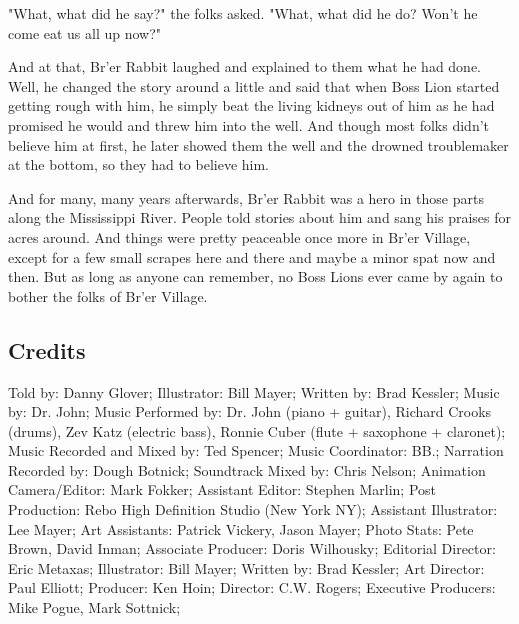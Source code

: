 "What, what did he say?" the folks asked. "What, what did he do? Won't he come eat us all up now?"

And at that, Br'er Rabbit laughed and explained to them what he had done. Well, he changed the story around a little and said that when Boss Lion started getting rough with him, he simply beat the living kidneys out of him as he had promised he would and threw him into the well. And though most folks didn't believe him at first, he later showed them the well and the drowned troublemaker at the bottom, so they had to believe him.

And for many, many years afterwards, Br'er Rabbit was a hero in those parts along the Mississippi River. People told stories about him and sang his praises for acres around. And things were pretty peaceable once more in Br'er Village, except for a few small scrapes here and there and maybe a minor spat now and then. But as long as anyone can remember, no Boss Lions ever came by again to bother the folks of Br'er Village.

\subsection{Credits}

Told by: Danny Glover;
Illustrator: Bill Mayer;
Written by: Brad Kessler;
Music by: Dr. John;
Music Performed by: Dr. John (piano + guitar), Richard Crooks (drums), Zev Katz (electric bass), Ronnie Cuber (flute + saxophone + claronet);
Music Recorded and Mixed by: Ted Spencer;
Music Coordinator: BB.;
Narration Recorded by: Dough Botnick;
Soundtrack Mixed by: Chris Nelson;
Animation Camera/Editor: Mark Fokker;
Assistant Editor: Stephen Marlin;
Post Production: Rebo High Definition Studio (New York NY);
Assistant Illustrator: Lee Mayer;
Art Assistants: Patrick Vickery, Jason Mayer;
Photo Stats: Pete Brown, David Inman;
Associate Producer: Doris Wilhousky;
Editorial Director: Eric Metaxas;
Illustrator: Bill Mayer;
Written by: Brad Kessler;
Art Director: Paul Elliott;
Producer: Ken Hoin;
Director: C.W. Rogers;
Executive Producers: Mike Pogue, Mark Sottnick;